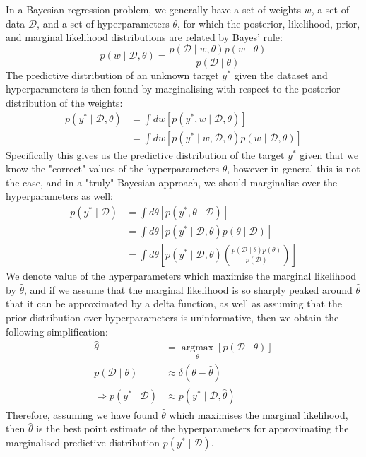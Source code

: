 In a Bayesian regression problem, we generally have a set of weights $w$, a set of data $\mathcal{D}$, and a set of hyperparameters $\theta$, for which the posterior, likelihood, prior, and marginal likelihood distributions are related by Bayes' rule:
\begin{equation}
    p(w \mid \mathcal{D}, \theta ) = \frac{p( \mathcal{D} \mid w, \theta ) p( w \mid \theta )}{p( \mathcal{D} \mid \theta )}
\end{equation}
The predictive distribution of an unknown target $y^*$ given the dataset and hyperparameters is then found by marginalising with respect to the posterior distribution of the weights:
\begin{align}
    p(y^* \mid \mathcal{D}, \theta ) &= \int{dw \left[ p(y^*, w \mid \mathcal{D}, \theta ) \right]} \\
    &= \int{dw\left[ p(y^* \mid w, \mathcal{D}, \theta ) p(w \mid \mathcal{D}, \theta ) \right]}
\end{align}
Specifically this gives us the predictive distribution of the target $y^*$ given that we know the "correct" values of the hyperparameters $\theta$, however in general this is not the case, and in a "truly" Bayesian approach, we should marginalise over the hyperparameters as well:
\begin{align}
    p(y^* \mid \mathcal{D} ) &= \int{d \theta \left[ p(y^*, \theta \mid \mathcal{D} ) \right]} \\
    &= \int{d \theta \left[ p(y^* \mid \mathcal{D}, \theta ) p( \theta \mid \mathcal{D} ) \right]} \\
    &= \int{d \theta \left[ p(y^* \mid \mathcal{D}, \theta ) \left( \frac{p( \mathcal{D} \mid \theta ) p( \theta )}{p( \mathcal{D} )} \right) \right]}
\end{align}
We denote value of the hyperparameters which maximise the marginal likelihood by $\hat{\theta}$, and if we assume that the marginal likelihood is so sharply peaked around $\hat{\theta}$ that it can be approximated by a delta function, as well as assuming that the prior distribution over hyperparameters is uninformative, then we obtain the following simplification:
\begin{align}
    \hat{\theta} &= \underset{\theta}{\operatorname{argmax}}{\left[ p( \mathcal{D} \mid \theta ) \right]} \\
    p( \mathcal{D} \mid \theta ) &\approx \delta( \theta - \hat{\theta} ) \\
    \Rightarrow p(y^* \mid \mathcal{D} ) &\approx p(y^* \mid \mathcal{D}, \hat{\theta} )
\end{align}
Therefore, assuming we have found $\hat{\theta}$ which maximises the marginal likelihood, then $\hat{\theta}$ is the best point estimate of the hyperparameters for approximating the marginalised predictive distribution $p(y^* \mid \mathcal{D})$.

